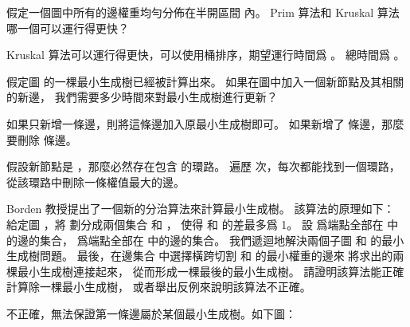 \startEXERCISE\DIFFICULT
假定一個圖中所有的邊權重均勻分佈在半開區間 \m{[0,1)} 內。
 Prim 算法和 Kruskal 算法哪一個可以運行得更快？
\stopEXERCISE

\startANSWER
Kruskal 算法可以運行得更快，可以使用桶排序，期望運行時間爲 。
總時間爲 。
\stopANSWER

\startEXERCISE\DIFFICULT
假定圖  的一棵最小生成樹已經被計算出來。
如果在圖中加入一個新節點及其相關的新邊，
我們需要多少時間來對最小生成樹進行更新？
\stopEXERCISE

\startANSWER
如果只新增一條邊，則將這條邊加入原最小生成樹即可。
如果新增了  條邊，那麼要刪除  條邊。

假設新節點是 ，那麼必然存在包含  的環路。
遍歷  次，每次都能找到一個環路，從該環路中刪除一條權值最大的邊。
\stopANSWER

\startEXERCISE
Borden 教授提出了一個新的分治算法來計算最小生成樹。
該算法的原理如下：
給定圖 ，將  劃分成兩個集合  和 ，
使得  和  的差最多爲 1。
設  爲端點全部在  中的邊的集合，
  爲端點全部在  中的邊的集合。
我們遞迴地解決兩個子圖  和  的最小生成樹問題。
最後，在邊集合  中選擇橫跨切割  和  的最小權重的邊來
將求出的兩棵最小生成樹連接起來，
從而形成一棵最後的最小生成樹。
請證明該算法能正確計算除一棵最小生成樹，
或者舉出反例來說明該算法不正確。
\stopEXERCISE

\startANSWER
不正確，無法保證第一條邊屬於某個最小生成樹。如下圖：

\externalfigure[output/e23_2_8-1]
\stopANSWER

\stopsection
